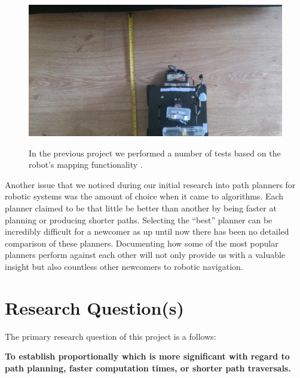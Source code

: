 \begin{figure}[htbp]

\center \includegraphics[width=350pt]{illustrations/third_year}\\
\caption{In the previous project we performed a number of tests based on the robot's mapping functionality \cite{JMD14}.} 
\label{Third Year}

\end{figure}

\noindent
Another issue that we noticed during our initial research into path planners for robotic systems was the amount of choice when it came to algorithms. Each planner claimed to be that little be better than another by being faster at planning or producing shorter paths. Selecting the ``best'' planner can be incredibly difficult for a newcomer as up until now there has been no detailed comparison of these planners. Documenting how some of the most popular planners perform against each other will not only provide us with a valuable insight but also countless other newcomers to robotic navigation. 

\newpage


\section{Research Question(s)}

\noindent
The primary research question of this project is a follows:

\begin{center}
\textbf{To establish proportionally which is more significant with regard to path planning, faster computation times, or shorter path traversals.} \\
\end{center}

